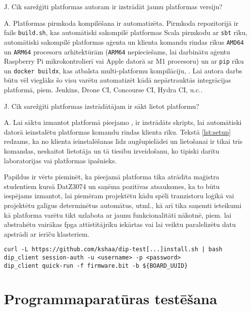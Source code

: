 J. Cik sarežģīti platformas autoram ir izstrādāt jaunu platformas versiju?

A. Platformas pirmkoda kompilēšana ir automatizēta. Pirmkoda repozitorijā ir
fails \lstinline!build.sh!, kas automātiski sakompilē platformas
 Scala pirmkodu ar \lstinline!sbt! rīku, automātiski
sakompilē platformas aģenta un klienta komandu rindas rīkus \lstinline!AMD64! un
\lstinline!ARM64! procesoru arhitektūrām (\lstinline!ARM64! nepieciešams, lai
darbinātu aģentu Raspberry Pi mikrokontrolierī vai Apple datorā ar M1 procesoru)
un ar \lstinline!pip! rīku un \lstinline!docker buildx!, kas atbalsta
multi-platformu kompilāciju, \cite{DockerBuildx}. Lai autora darbs būtu vēl
vieglāks šo visu varētu automatizēt kādā nepārtrauktās integrācijas platformā,
piem. Jenkins, Drone CI, Concourse CI, Hydra CI, u.c..

J. Cik sarežģīti platformas izstrādātājam ir sākt lietot platformu?

A. Lai sāktu izmantot platformā pieejamo , ir
izstrādāts skripts, lai automātiski datorā ieinstalētu platformas komandu rindas
klienta rīku. Tekstā \ref{lst:setup} redzams, ka no klienta ieinstalēšanas līdz
 augšupielādei un lietošanai ir tikai trīs
komandas, neskaitot lietotāja un tā tiesību izveidošanu, ko tipiski darītu
laboratorijas vai platformas īpašnieks.

Papildus ir vērts pieminēt, ka pieejamā platforma tika atrādīta maģistra
studentiem kursā DatZ3074 un saņēma pozitīvas atsauksmes, ka to būtu iespējams
izmantot, lai piemēram projektētu kādu spēli tranzistoru loģikā vai projektētu
galīgus determinētus automātus, utml., kā arī tika saņemti ieteikumi kā
platforma varētu tikt uzlabota ar jaunu funkcionalitāti nākotnē, piem. lai
abstrahētu vairākas \gls{fpga} attīstītājrīku iekārtas vai lai veiktu
paralelizētu datu apstrādi ar ierīču klasteriem. 

\begin{lstlisting}[caption={Platformas klienta lietošanas uzsākšana},label={lst:setup},captionpos=b]
curl -L https://github.com/kshaa/dip-test[...]install.sh | bash
dip_client session-auth -u <username> -p <password>
dip_client quick-run -f firmware.bit -b ${BOARD_UUID}
\end{lstlisting}

\section{Programmaparatūras testēšana}
\label{sec:testing}

